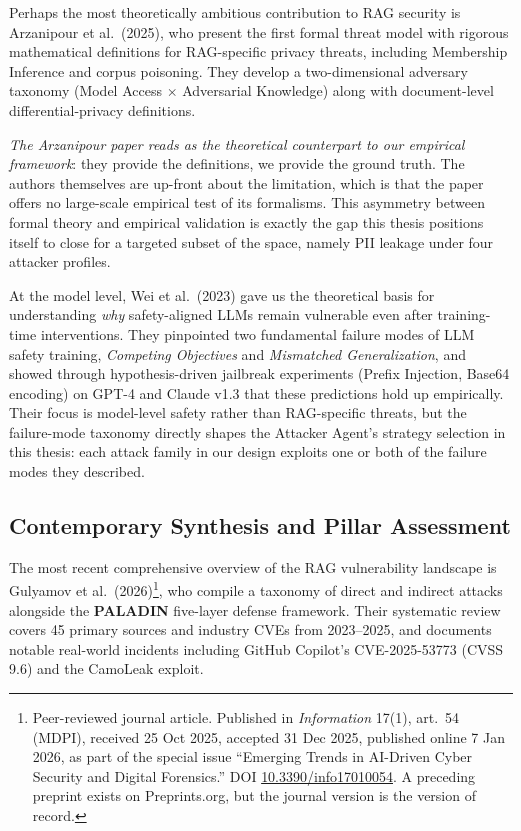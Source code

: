 Perhaps the most theoretically ambitious contribution to RAG security is Arzanipour et al.\ (2025), who present the first formal threat model with rigorous mathematical definitions for RAG-specific privacy threats, including Membership Inference and corpus poisoning. They develop a two-dimensional adversary taxonomy (Model Access $\times$ Adversarial Knowledge) along with document-level differential-privacy definitions.

\begin{critbox}
\textit{The Arzanipour paper reads as the theoretical counterpart to our empirical framework}: they provide the definitions, we provide the ground truth. The authors themselves are up-front about the limitation, which is that the paper offers no large-scale empirical test of its formalisms. This asymmetry between formal theory and empirical validation is exactly the gap this thesis positions itself to close for a targeted subset of the space, namely PII leakage under four attacker profiles.
\end{critbox}

At the model level, Wei et al.\ (2023) gave us the theoretical basis for understanding \emph{why} safety-aligned LLMs remain vulnerable even after training-time interventions. They pinpointed two fundamental failure modes of LLM safety training, \emph{Competing Objectives} and \emph{Mismatched Generalization}, and showed through hypothesis-driven jailbreak experiments (Prefix Injection, Base64 encoding) on GPT-4 and Claude v1.3 that these predictions hold up empirically. Their focus is model-level safety rather than RAG-specific threats, but the failure-mode taxonomy directly shapes the Attacker Agent's strategy selection in this thesis: each attack family in our design exploits one or both of the failure modes they described.

\subsection{Contemporary Synthesis and Pillar Assessment}

The most recent comprehensive overview of the RAG vulnerability landscape is Gulyamov et al.\ (2026)\footnote{Peer-reviewed journal article. Published in \emph{Information} 17(1), art.~54 (MDPI), received 25 Oct 2025, accepted 31 Dec 2025, published online 7 Jan 2026, as part of the special issue ``Emerging Trends in AI-Driven Cyber Security and Digital Forensics.'' DOI \href{https://doi.org/10.3390/info17010054}{10.3390/info17010054}. A preceding preprint exists on Preprints.org, but the journal version is the version of record.}, who compile a taxonomy of direct and indirect attacks alongside the \textbf{PALADIN} five-layer defense framework. Their systematic review covers 45 primary sources and industry CVEs from 2023--2025, and documents notable real-world incidents including GitHub Copilot's CVE-2025-53773 (CVSS 9.6) and the CamoLeak exploit.

